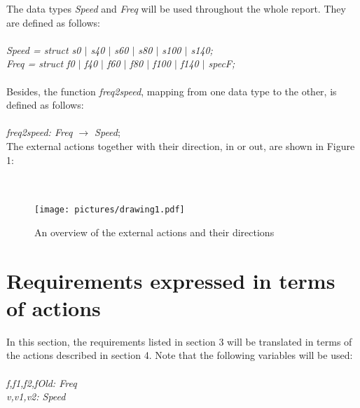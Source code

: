\documentclass[11pt,a4paper]{article}
\begin{document}
\setlength{\parindent}{0pt}

The data types \textit{Speed} and \textit{Freq} will be used throughout the whole report. They are defined as follows:\\
\\
\textit{Speed = struct s0 $\mid$ s40 $\mid$ s60 $\mid$ s80 $\mid$ s100 $\mid$ s140;}
\\
\textit{Freq = struct f0 $\mid$ f40 $\mid$ f60 $\mid$ f80 $\mid$ f100 $\mid$ f140 $\mid$ specF;}\\
\\
Besides, the function \textit{freq2speed}, mapping from one data type to the other, is defined as follows:\\
\\
\textit{freq2speed: Freq $\rightarrow$ Speed};\\

The external actions together with their direction, in or out, are shown in Figure 1: 
\\
\\
\\

\begin{figure}[h]
	\centering
	\texttt{[image: pictures/drawing1.pdf]}
	\caption{An overview of the external actions and their directions}
\end{figure}


\clearpage

\newpage

\section{Requirements expressed in terms of actions}

In this section, the requirements listed in section 3 will be translated in terms of the actions described in section 4. Note that the following variables will be used:\\
\\





\textit{f,f1,f2,fOld: Freq} \\

\textit{v,v1,v2: Speed} \\
\end{document}
